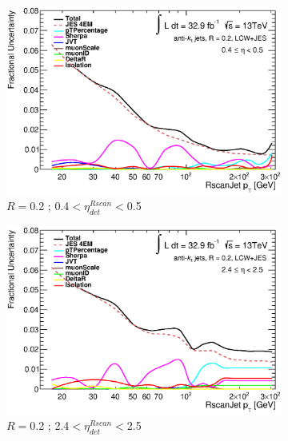 \begin{figure}[ht]
    \centering
    \begin{subfigure}[b]{0.495\textwidth}
        \centering
        \includegraphics[width=\textwidth]{images/SumIn2_Eta_49_2LC_wContributions.eps}
        \caption{$R=$0.2 ; 0.4$<\eta^{Rscan}_{det}<$0.5}
    \end{subfigure}
    \hfill
    \begin{subfigure}[b]{0.495\textwidth}
        \centering
        \includegraphics[width=\textwidth]{images/SumIn2_Eta_69_2LC_wContributions.eps}
        \caption{$R=$0.2 ; 2.4$<\eta^{Rscan}_{det}<$2.5}
    \end{subfigure}
    \vfill
    \begin{subfigure}[b]{0.495\textwidth}
        \centering

\end{subfigure}
\end{figure}
